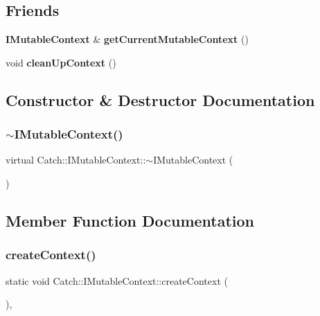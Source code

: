 \subsection*{Friends}
\begin{DoxyCompactItemize}
\item 
\textbf{ I\+Mutable\+Context} \& \textbf{ get\+Current\+Mutable\+Context} ()
\item 
void \textbf{ clean\+Up\+Context} ()
\end{DoxyCompactItemize}


\subsection{Constructor \& Destructor Documentation}
\mbox{\label{struct_catch_1_1_i_mutable_context_a93f32b2ab6d0fb83637059240be799ab}} 
\subsubsection{$\sim$IMutableContext()}
{\footnotesize\ttfamily virtual Catch\+::\+I\+Mutable\+Context\+::$\sim$\+I\+Mutable\+Context (\begin{DoxyParamCaption}{ }\end{DoxyParamCaption})\hspace{0.3cm}{\ttfamily [virtual]}}



\subsection{Member Function Documentation}
\mbox{\label{struct_catch_1_1_i_mutable_context_a17e4b3f9a9674af7e2c4f081c692a628}} 
\subsubsection{createContext()}
{\footnotesize\ttfamily static void Catch\+::\+I\+Mutable\+Context\+::create\+Context (\begin{DoxyParamCaption}{ }\end{DoxyParamCaption})\hspace{0.3cm}{\ttfamily [static]}, {\ttfamily [private]}}

